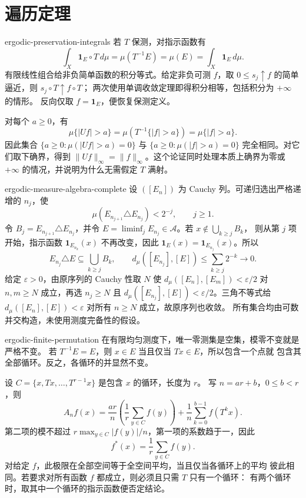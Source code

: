 \chapter{遍历定理}

\begin{solution}{ergodic-preservation-integrals}
若 $T$ 保测，对指示函数有
\[
 \int_X\mathbf1_E\circ T\,d\mu
 =\mu(T^{-1}E)=\mu(E)=\int_X\mathbf1_E\,d\mu.
\]
有限线性组合给非负简单函数的积分等式。给定非负可测 $f$，取
$0\le s_j\uparrow f$ 的简单逼近，则 $s_j\circ T\uparrow f\circ T$；
两次使用单调收敛定理即得积分相等，包括积分为 $+\infty$ 的情形。
反向仅取 $f=\mathbf1_E$，便恢复保测定义。

对每个 $a\ge0$，有
\[
 \mu\{|Uf|>a\}
 =\mu(T^{-1}\{|f|>a\})=\mu\{|f|>a\}.
\]
因此集合 $\{a\ge0:\mu(|Uf|>a)=0\}$ 与
$\{a\ge0:\mu(|f|>a)=0\}$ 完全相同。对它们取下确界，得到
$\|Uf\|_\infty=\|f\|_\infty$。这个论证同时处理本质上确界为零或
$+\infty$ 的情况，并说明为什么无需假定 $T$ 满射。
\end{solution}

\begin{solution}{ergodic-measure-algebra-complete}
设 $([E_n])$ 为 Cauchy 列。可递归选出严格递增的 $n_j$，使
\[
 \mu(E_{n_{j+1}}\triangle E_{n_j})<2^{-j},\qquad j\ge1.
\]
令 $B_j=E_{n_{j+1}}\triangle E_{n_j}$，并令
$E=\liminf_jE_{n_j}\in\mathcal A$。若 $x\notin\bigcup_{k\ge j}B_k$，
则从第 $j$ 项开始，指示函数 $\mathbf1_{E_{n_k}}(x)$ 不再改变，因此
$\mathbf1_E(x)=\mathbf1_{E_{n_j}}(x)$。所以
\[
 E_{n_j}\triangle E\subseteq\bigcup_{k\ge j}B_k,
 \qquad
 d_\mu([E_{n_j}],[E])\le\sum_{k\ge j}2^{-k}\longrightarrow0.
\]
给定 $\varepsilon>0$，由原序列的 Cauchy 性取 $N$ 使
$d_\mu([E_n],[E_m])<\varepsilon/2$ 对 $n,m\ge N$ 成立，再选
$n_j\ge N$ 且 $d_\mu([E_{n_j}],[E])<\varepsilon/2$。三角不等式给
$d_\mu([E_n],[E])<\varepsilon$ 对所有 $n\ge N$ 成立，故原序列也收敛。
所有集合均由可数并交构造，未使用测度完备性的假设。
\end{solution}

\begin{solution}{ergodic-finite-permutation}
在有限均匀测度下，唯一零测集是空集，模零不变就是严格不变。
若 $T^{-1}E=E$，则 $x\in E$ 当且仅当 $Tx\in E$，所以包含一个点就
包含其全部循环。反之，各循环的并显然不变。

设 $C=\{x,Tx,\ldots,T^{r-1}x\}$ 是包含 $x$ 的循环，长度为 $r$。
写 $n=ar+b$，$0\le b<r$，则
\[
 A_nf(x)=\frac{ar}{n}\left(\frac1r\sum_{y\in C}f(y)\right)
       +\frac1n\sum_{k=0}^{b-1}f(T^kx).
\]
第二项的模不超过 $r\max_{y\in C}|f(y)|/n$，第一项的系数趋于一，因此
\[
 f^*(x)=\frac1r\sum_{y\in C}f(y).
\]
对给定 $f$，此极限在全部空间等于全空间平均，当且仅当各循环上的平均
彼此相同。若要求对所有函数 $f$ 都成立，则必须且只需 $T$ 只有一个循环：
有两个循环时，取其中一个循环的指示函数便否定结论。
\end{solution}

